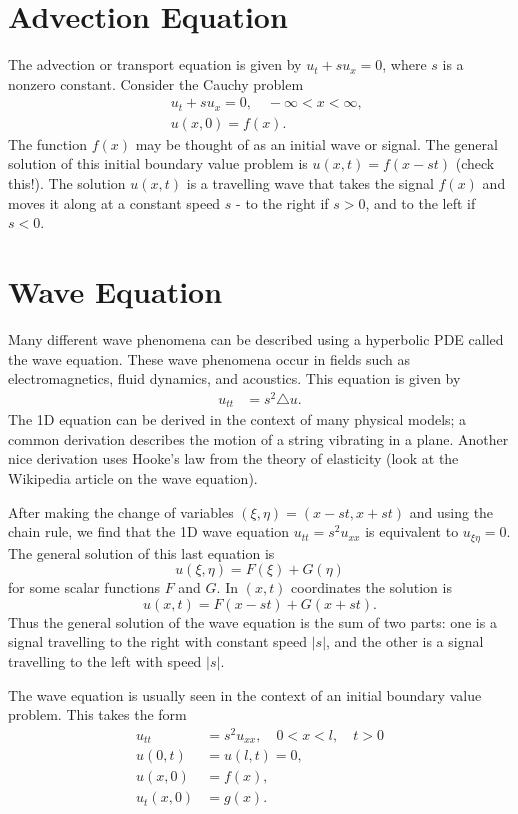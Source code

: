 \label{lab:waveeqn}


\section{Advection Equation}
The advection or transport equation is given by $u_t + s u_x = 0$, where $s$ is a nonzero constant.  
Consider the Cauchy problem 
\begin{align*}
	& u_t + su_x = 0, \quad -\infty < x < \infty,\\\
	& u(x,0) = f(x).
\end{align*}
The function $f(x)$ may be thought of as an initial wave or signal. The general solution of this initial boundary value problem is $u(x,t) = f(x-st)$ (check this!). The solution $u(x,t)$ is a travelling wave that takes the signal $f(x)$ and moves it along at a constant speed $s$ - to the right if $s > 0$, and to the left if $s < 0$. 

\section{Wave Equation}
Many different wave phenomena can be described using a hyperbolic PDE called the wave equation. 
These wave phenomena occur in fields such as electromagnetics, fluid dynamics, and acoustics. 
This equation is given by 
\begin{align}
	u_{tt} &= s^2 \triangle u.
\end{align}
The 1D equation can be derived in the context of many physical models; a common derivation describes the motion of a string vibrating in a plane. Another nice derivation uses Hooke's law from the theory of elasticity (look at the Wikipedia article on the wave equation).  

After making the change of variables $(\xi,\eta) = (x-st, x + st)$ and using the chain rule, we find that the 1D wave equation $u_{tt} = s^2 u_{xx}$ is equivalent to $u_{\xi \eta} = 0$. The general solution of this last equation is 
\[ u(\xi, \eta) = F(\xi) + G(\eta) \]
for some scalar functions $F$ and $G$. In $(x,t)$ coordinates the solution is 
\[u(x,t) = F(x-st) + G(x+st).\]
Thus the general solution of the wave equation is the sum of two parts: one is a signal travelling to the right with constant speed $|s|$, and the other is a signal travelling to the left with speed $|s|$.

The wave equation is usually seen in the context of an initial boundary value problem. 
This takes the form 
\begin{align*}
	u_{tt} &= s^2 u_{xx}, \quad 0 < x < l, \quad t > 0\\
	u(0,t) &= u(l,t) = 0, \\
	u(x,0) &= f(x),\\ 
	u_t(x,0) &= g(x).
\end{align*}

